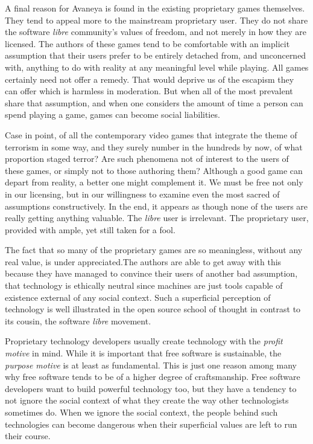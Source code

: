 A final reason for Avaneya is found in the existing proprietary games themselves. They tend to appeal more to the mainstream proprietary user. They do not share the software {\it libre} community's values of freedom, and not merely in how they are licensed. The authors of these games tend to be comfortable with an implicit assumption that their users prefer to be entirely detached from, and unconcerned with, anything to do with reality at any meaningful level while playing. All games certainly need not offer a remedy. That would deprive us of the escapism they can offer which is harmless in moderation. But when all of the most prevalent share that assumption, and when one considers the amount of time a person can spend playing a game, games can become social liabilities.

Case in point, of all the contemporary video games that integrate the theme of terrorism in some way, and they surely number in the hundreds by now, of what proportion staged terror? Are such phenomena not of interest to the users of these games, or simply not to those authoring them? Although a good game can depart from reality, a better one might complement it. We must be free not only in our licensing, but in our willingness to examine even the most sacred of assumptions constructively. In the end, it appears as though none of the users are really getting anything valuable. The {\it libre} user is irrelevant. The proprietary user, provided with ample, yet still taken for a fool. 

The fact that so many of the proprietary games are so meaningless, without any real value, is under appreciated. The authors are able to get away with this because they have managed to convince their users of another bad assumption, that technology is ethically neutral since machines are just tools capable of existence external of any social context. Such a superficial perception of technology is well illustrated in the open source school of thought in contrast to its cousin, the software {\it libre} movement. 

Proprietary technology developers usually create technology with the {\it profit motive} in mind. While it is important that free software is sustainable, the {\it purpose motive} is at least as fundamental. This is just one reason among many why free software tends to be of a higher degree of craftsmanship. Free software developers want to build powerful technology too, but they have a tendency to not ignore the social context of what they create the way other technologists sometimes do. When we ignore the social context, the people behind such technologies can become dangerous when their superficial values are left to run their course.\footnotecite[black2012]

